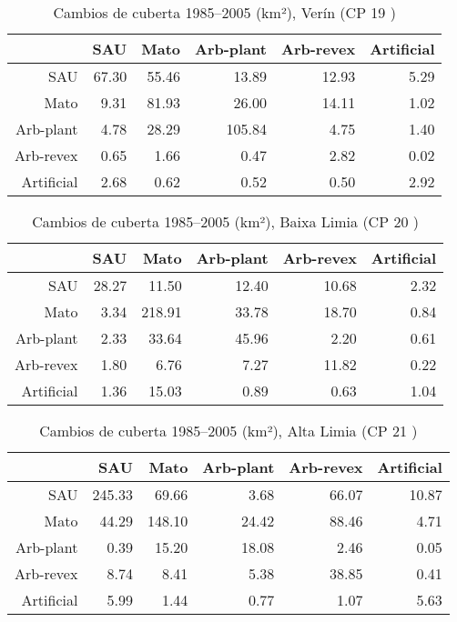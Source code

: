 \begin{table}[p]
\centering
\caption{Cambios de cuberta 1985--2005 (km²), Verín (CP 19 )} 
\label{TaboaContinxCP19}
\begin{tabular}{rrrrrr}
  \hline
 & SAU & Mato & Arb-plant & Arb-revex & Artificial \\ 
  \hline
SAU & 67.30 & 55.46 & 13.89 & 12.93 & 5.29 \\ 
  Mato & 9.31 & 81.93 & 26.00 & 14.11 & 1.02 \\ 
  Arb-plant & 4.78 & 28.29 & 105.84 & 4.75 & 1.40 \\ 
  Arb-revex & 0.65 & 1.66 & 0.47 & 2.82 & 0.02 \\ 
  Artificial & 2.68 & 0.62 & 0.52 & 0.50 & 2.92 \\ 
   \hline
\end{tabular}
\end{table}
\begin{table}[p]
\centering
\caption{Cambios de cuberta 1985--2005 (km²), Baixa Limia (CP 20 )} 
\label{TaboaContinxCP20}
\begin{tabular}{rrrrrr}
  \hline
 & SAU & Mato & Arb-plant & Arb-revex & Artificial \\ 
  \hline
SAU & 28.27 & 11.50 & 12.40 & 10.68 & 2.32 \\ 
  Mato & 3.34 & 218.91 & 33.78 & 18.70 & 0.84 \\ 
  Arb-plant & 2.33 & 33.64 & 45.96 & 2.20 & 0.61 \\ 
  Arb-revex & 1.80 & 6.76 & 7.27 & 11.82 & 0.22 \\ 
  Artificial & 1.36 & 15.03 & 0.89 & 0.63 & 1.04 \\ 
   \hline
\end{tabular}
\end{table}
\begin{table}[p]
\centering
\caption{Cambios de cuberta 1985--2005 (km²), Alta Limia (CP 21 )} 
\label{TaboaContinxCP21}
\begin{tabular}{rrrrrr}
  \hline
 & SAU & Mato & Arb-plant & Arb-revex & Artificial \\ 
  \hline
SAU & 245.33 & 69.66 & 3.68 & 66.07 & 10.87 \\ 
  Mato & 44.29 & 148.10 & 24.42 & 88.46 & 4.71 \\ 
  Arb-plant & 0.39 & 15.20 & 18.08 & 2.46 & 0.05 \\ 
  Arb-revex & 8.74 & 8.41 & 5.38 & 38.85 & 0.41 \\ 
  Artificial & 5.99 & 1.44 & 0.77 & 1.07 & 5.63 \\ 
   \hline
\end{tabular}
\end{table}
